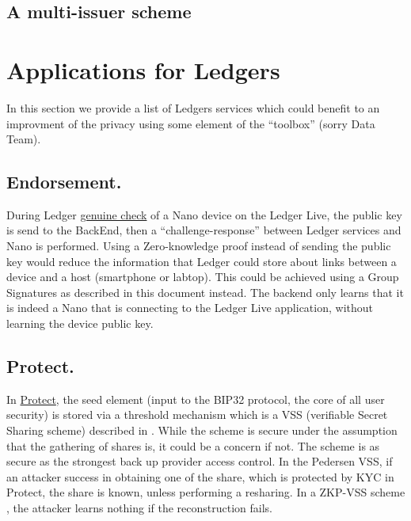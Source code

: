\documentclass[11pt]{llncs2e/llncs}
\begin{document}
\subsection{A multi-issuer scheme}


\section{Applications for Ledgers}

In this section we provide a list of Ledgers services which could benefit to an improvment of the privacy using some element of the ``toolbox'' (sorry Data Team).

\subsection{Endorsement.} During Ledger \href{https://github.com/LedgerHQ/blue-loader-python/blob/master/ledgerblue/checkGenuine.py}{genuine check} of a Nano device on the Ledger Live, the public key is send to the BackEnd, then a ``challenge-response'' between Ledger services and Nano is performed. Using a Zero-knowledge proof instead of sending the public key would reduce the information that Ledger could store about links between a device and a host (smartphone or labtop). This could be achieved using a Group Signatures as described in this document instead. The backend only learns that it is indeed a Nano that is connecting to the Ledger Live application, without learning the device public key.


\subsection{Protect.} In \href{https://ledgerhq.atlassian.net/wiki/spaces/TrustServices/pages/3548971279/Protect+Arch+Crypto+Protocol+Specification}{Protect}, the seed element (input to the BIP32 protocol, the core of all user security) is stored via a threshold mechanism which is a VSS (verifiable Secret Sharing scheme) described in \cite{Pedersen91}. While the scheme is secure under the assumption that the gathering of shares is, it could be a concern if not. The scheme is as secure as the strongest back up provider access control. In the Pedersen VSS, if an attacker success in obtaining one of the share, which is protected by KYC in Protect, the share is known, unless performing a resharing. In a ZKP-VSS scheme \cite{Kate10}, the attacker learns nothing if the reconstruction fails.
\end{document}
